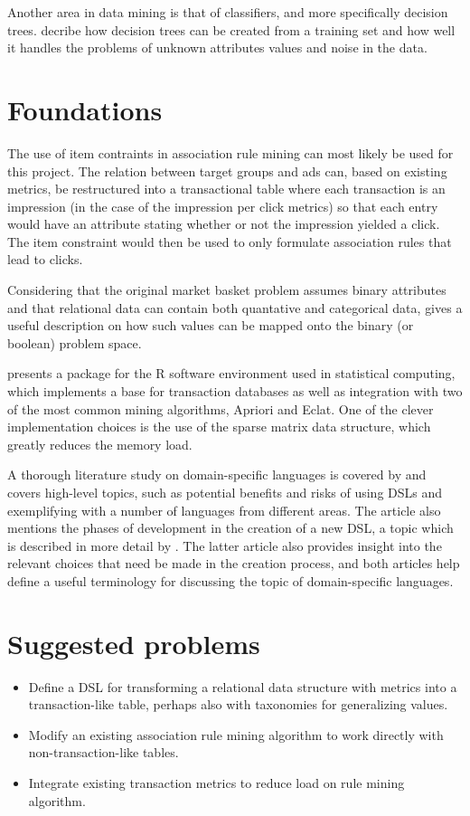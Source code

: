 \documentclass[a4paper]{article}
\begin{document}
Another area in data mining is that of classifiers, and more specifically decision trees. \citet{Quinlan1986} decribe how
decision trees can be created from a training set and how well it handles the problems of unknown attributes values and noise
in the data.

\section{Foundations}

The use of item contraints in association rule mining \citep{Srikant1997} can most likely be used for this project. The
relation between target groups and ads can, based on existing metrics, be restructured into a transactional table where each
transaction is an impression (in the case of the impression per click metrics) so that each entry would have an attribute
stating whether or not the impression yielded a click. The item constraint would then be used to only formulate association
rules that lead to clicks.

Considering that the original market basket problem assumes binary attributes and that relational data can contain both
quantative and categorical data, \citep{Srikant1996} gives a useful description on how such values can be mapped onto the
binary (or boolean) problem space.

\citet{Hahsler2007} presents a package for the R software environment used in statistical computing, which implements a base
for transaction databases as well as integration with two of the most common mining algorithms, Apriori and Eclat. One of the
clever implementation choices is the use of the sparse matrix data structure, which greatly reduces the memory load.

A thorough literature study on domain-specific languages is covered by \citet{Deursen2000} and covers high-level topics, such as
potential benefits and risks of using DSLs and exemplifying with a number of languages from different areas. The article also
mentions the phases of development in the creation of a new DSL, a topic which is described in more detail by \citet{Mernik2005}.
The latter article also provides insight into the relevant choices that need be made in the creation process, and both articles
help define a useful terminology for discussing the topic of domain-specific languages.

\section{Suggested problems}
\begin{itemize}
	\item Define a DSL for transforming a relational data structure with metrics into a transaction-like table,
			perhaps also with taxonomies for generalizing values.
	\item Modify an existing association rule mining algorithm to work directly with non-transaction-like tables.
	\item Integrate existing transaction metrics to reduce load on rule mining algorithm.
\end{itemize}
\end{document}
